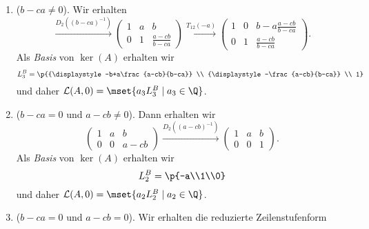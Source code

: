 \documentclass[a4paper]{article}
\begin{document}
\begin{example}
    \begin{enumerate}[{Fall~}1, leftmargin=*]
        \item ($b-ca \neq 0$). Wir erhalten
        \begin{equation*}
            \xrightarrow{D_2((b-ca)^{-1})}
            \begin{pmatrix}
                1 & a & b \\
                0 & 1 & {\displaystyle \frac{a-cb}{b-ca}}
            \end{pmatrix}
            \xrightarrow{T_{12}(-a)}
            \begin{pmatrix}
                1 & 0 & {\displaystyle b-a\frac{a-cb}{b-ca}} \\
                0 & 1 & {\displaystyle \frac{a-cb}{b-ca}}
            \end{pmatrix}.
        \end{equation*}
        Als \emph{Basis} von $\ker(A)$ erhalten wir
        \begin{equation*}
            L_3^B = \p{{\displaystyle -b+a\frac{a-cb}{b-ca}} \\ {\displaystyle -\frac{a-cb}{b-ca}} \\ 1}
        \end{equation*}
        und daher $\mathcal{L}(A, 0) = \mset{a_3L_3^B \mid a_3 \in \Q}$.
        \item ($b-ca = 0$ und $a-cb \neq 0$). Dann erhalten wir
        \begin{equation*}
            \begin{pmatrix}
                1 & a & b \\
                0 & 0 & a-cb
            \end{pmatrix}
            \xrightarrow{D_2((a-cb)^{-1})}
            \begin{pmatrix}
                1 & a & b \\
                0 & 0 & 1
            \end{pmatrix}.
        \end{equation*}
        Als \emph{Basis} von $\ker(A)$ erhalten wir
        \begin{equation*}
            L_2^B = \p{-a\\1\\0}
        \end{equation*}
        und daher $\mathcal{L}(A, 0) = \mset{a_2L_2^B \mid a_2 \in \Q}$.
        \item ($b-ca = 0$ und $a-cb = 0$). Wir erhalten die reduzierte Zeilenstufenform

\end{enumerate}
\end{example}
\end{document}
